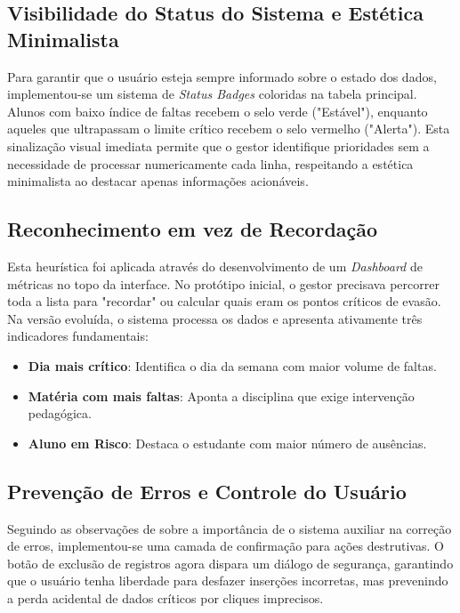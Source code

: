 \documentclass[12pt]{article}
\begin{document}
\subsection{Visibilidade do Status do Sistema e Estética Minimalista}
Para garantir que o usuário esteja sempre informado sobre o estado dos dados, implementou-se um sistema de \textit{Status Badges} 
coloridas na tabela principal. Alunos com baixo índice de faltas recebem o selo verde ("Estável"), enquanto aqueles que ultrapassam 
o limite crítico recebem o selo vermelho ("Alerta"). Esta sinalização visual imediata permite que o gestor identifique prioridades sem 
a necessidade de processar numericamente cada linha, respeitando a estética minimalista ao destacar apenas informações acionáveis\cite{nielsen, antonino}.

\subsection{Reconhecimento em vez de Recordação}
Esta heurística foi aplicada através do desenvolvimento de um \textit{Dashboard} de métricas no topo da interface. 
No protótipo inicial, o gestor precisava percorrer toda a lista para "recordar" ou calcular quais eram os pontos críticos de evasão. 
Na versão evoluída, o sistema processa os dados e apresenta ativamente três indicadores fundamentais:
\begin{itemize}
    \item \textbf{Dia mais crítico}: Identifica o dia da semana com maior volume de faltas.
    \item \textbf{Matéria com mais faltas}: Aponta a disciplina que exige intervenção pedagógica.
    \item \textbf{Aluno em Risco}: Destaca o estudante com maior número de ausências.
\end{itemize}

\subsection{Prevenção de Erros e Controle do Usuário}
Seguindo as observações de \cite{antonino} sobre a importância de o sistema auxiliar na correção de erros, 
implementou-se uma camada de confirmação para ações destrutivas\cite{rocha}. O botão de exclusão de registros 
agora dispara um diálogo de segurança, garantindo que o usuário tenha liberdade para desfazer inserções incorretas, 
mas prevenindo a perda acidental de dados críticos por cliques imprecisos.
\end{document}
